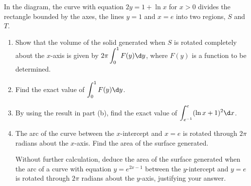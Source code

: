 \documentclass{jhwhw}
\begin{document}

    \problem{}
        In the diagram, the curve with equation $2y = 1 + \ln x$ for $x > 0$ divides the rectangle bounded by the axes, the lines $y = 1$ and $x = e$ into two regions, $S$ and $T$.

        \begin{center}
        \end{center}

        \begin{enumerate}
            \item Show that the volume of the solid generated when $S$ is rotated completely about the $x$-axis is given by $2\pi \displaystyle\int_0^1 F(y) \d y$, where $F(y)$ is a function to be determined.
            \item Find the exact value of $\displaystyle\int_0^1 F(y) \d y$.
            \item By using the result in part (b), find the exact value of $\displaystyle\int_{e^{-1}}^e (\ln x + 1)^2 \d x$.
            \item The arc of the curve between the $x$-intercept and $x = e$ is rotated through $2\pi$ radians about the $x$-axis. Find the area of the surface generated.
            
            Without further calculation, deduce the area of the surface generated when the arc of a curve with equation $y = e^{2x-1}$ between the $y$-intercept and $y = e$ is rotated through $2\pi$ radians about the $y$-axis, justifying your answer.
        \end{enumerate}
\end{document}
